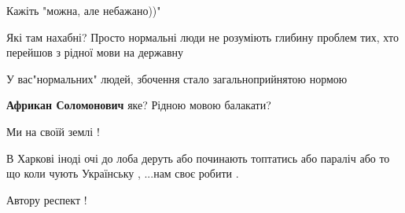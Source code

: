 \begin{itemize}
\begin{itemize}
 
Кажіть "можна, але небажано))"
\end{itemize}

 
Які там нахабні? Просто нормальні люди не розуміють глибину проблем тих, хто
перейшов з рідної мови на державну 🐸

\begin{itemize}
 
У вас"нормальних" людей, збочення стало загальноприйнятою нормою

 
\textbf{Африкан Соломонович} яке? Рідною мовою балакати?
\end{itemize}

 
Ми на своїй землі !

В Харкові іноді очі до лоба деруть або починають топтатись або параліч або то
що коли чують Українську , ...нам своє робити .

Автору респект !

 

\end{itemize}
